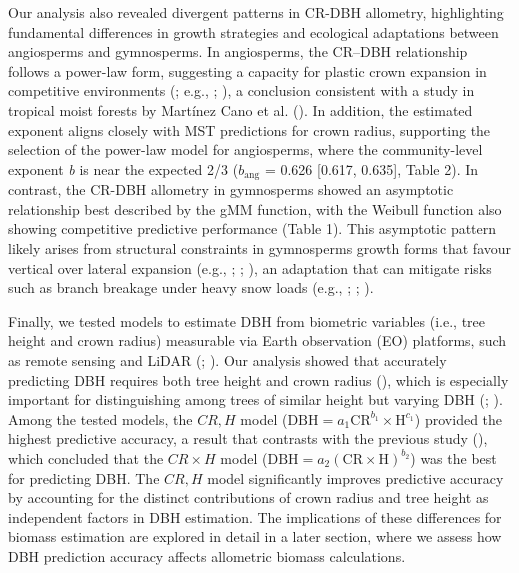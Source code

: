 \documentclass[
  12pt,
  letterpaper,
  DIV=11,
  numbers=noendperiod]{scrartcl}
\begin{document}
Our analysis also revealed divergent patterns in CR-DBH allometry,
highlighting fundamental differences in growth strategies and ecological
adaptations between angiosperms and gymnosperms. In angiosperms, the
CR--DBH relationship follows a power-law form, suggesting a capacity for
plastic crown expansion in competitive environments
(; e.g.,
;
), a conclusion
consistent with a study in tropical moist forests by Martínez Cano et
al. (). In addition, the estimated
exponent aligns closely with MST predictions for crown radius,
supporting the selection of the power-law model for angiosperms, where
the community-level exponent \emph{b} is near the expected 2/3
(\(b_{\text{ang}}\) = 0.626 {[}0.617, 0.635{]}, Table 2). In contrast,
the CR-DBH allometry in gymnosperms showed an asymptotic relationship
best described by the gMM function, with the Weibull function also
showing competitive predictive performance (Table 1). This asymptotic
pattern likely arises from structural constraints in gymnosperms growth
forms that favour vertical over lateral expansion (e.g.,
;
;
), an adaptation that can
mitigate risks such as branch breakage under heavy snow loads (e.g.,
; ; ).

Finally, we tested models to estimate DBH from biometric variables
(i.e., tree height and crown radius) measurable via Earth observation
(EO) platforms, such as remote sensing and LiDAR
(;
). Our analysis showed that
accurately predicting DBH requires both tree height and crown radius
(), which is especially
important for distinguishing among trees of similar height but varying
DBH (; ). Among the tested models, the \(CR,H\) model
(\(\mathrm{DBH} = a_1 \mathrm{CR}^{b_1} \times \mathrm{H}^{c_1}\))
provided the highest predictive accuracy, a result that contrasts with
the previous study (),
which concluded that the \(CR \times H\) model
(\(\mathrm{DBH} = a_2(\mathrm{CR} \times \mathrm{H})^{b_2}\)) was the
best for predicting DBH. The \(CR,H\) model significantly improves
predictive accuracy by accounting for the distinct contributions of
crown radius and tree height as independent factors in DBH estimation.
The implications of these differences for biomass estimation are
explored in detail in a later section, where we assess how DBH
prediction accuracy affects allometric biomass calculations.
\end{document}
